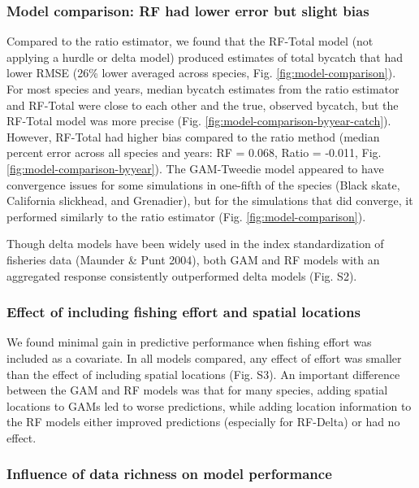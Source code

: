 \documentclass[]{article}
\begin{document}
\hypertarget{model-comparison-rf-had-lower-error-but-slight-bias}{%
\subsubsection{Model comparison: RF had lower error but slight
bias}\label{model-comparison-rf-had-lower-error-but-slight-bias}}

Compared to the ratio estimator, we found that the RF-Total model (not
applying a hurdle or delta model) produced estimates of total bycatch
that had lower RMSE (26\% lower averaged across species, Fig.
\ref{fig:model-comparison}). For most species and years, median bycatch
estimates from the ratio estimator and RF-Total were close to each other
and the true, observed bycatch, but the RF-Total model was more precise
(Fig. \ref{fig:model-comparison-byyear-catch}). However, RF-Total had
higher bias compared to the ratio method (median percent error across
all species and years: RF = 0.068, Ratio = -0.011, Fig.
\ref{fig:model-comparison-byyear}). The GAM-Tweedie model appeared to
have convergence issues for some simulations in one-fifth of the species
(Black skate, California slickhead, and Grenadier), but for the
simulations that did converge, it performed similarly to the ratio
estimator (Fig. \ref{fig:model-comparison}).

Though delta models have been widely used in the index standardization
of fisheries data (Maunder \& Punt 2004), both GAM and RF models with an
aggregated response consistently outperformed delta models (Fig. S2).

\hypertarget{effect-of-including-fishing-effort-and-spatial-locations}{%
\subsubsection{Effect of including fishing effort and spatial
locations}\label{effect-of-including-fishing-effort-and-spatial-locations}}

We found minimal gain in predictive performance when fishing effort was
included as a covariate. In all models compared, any effect of effort
was smaller than the effect of including spatial locations (Fig. S3). An
important difference between the GAM and RF models was that for many
species, adding spatial locations to GAMs led to worse predictions,
while adding location information to the RF models either improved
predictions (especially for RF-Delta) or had no effect.

\hypertarget{influence-of-data-richness-on-model-performance}{%
\subsubsection{Influence of data richness on model
performance}\label{influence-of-data-richness-on-model-performance}}
\end{document}
